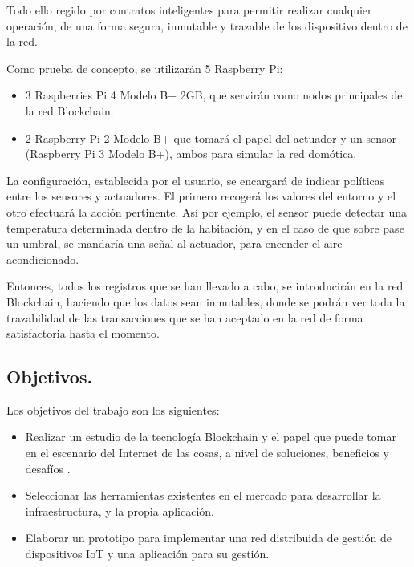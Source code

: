 \vspace{5mm}

\noindent Todo ello regido por contratos inteligentes para permitir realizar cualquier operación, de una forma segura, 
inmutable y trazable de los dispositivo dentro de la red.

\vspace{20mm}

\noindent Como prueba de concepto, se utilizarán 5 Raspberry Pi: 

\begin{itemize}
	\item 3 Raspberries Pi 4 Modelo B+ 2GB, que servirán como nodos principales de la red Blockchain.
	\item 2 Raspberry Pi 2 Modelo B+ que tomará el papel del actuador y un sensor (Raspberry Pi 3 Modelo B+), ambos 
	para simular la red domótica.
\end{itemize}

\noindent La configuración, establecida por el usuario, se encargará de indicar políticas entre los sensores 
y actuadores. El primero recogerá los valores del entorno y el otro efectuará la acción pertinente. Así por ejemplo, 
el sensor puede detectar una temperatura determinada dentro de la habitación, y en el caso de que sobre pase un 
umbral, se mandaría una señal al actuador, para encender el aire acondicionado. \cite{huh2017managing}

\vspace{5mm}

\noindent Entonces, todos los registros que se han llevado a cabo, se introducirán en la red Blockchain, haciendo que 
los datos sean inmutables, donde se podrán ver toda la trazabilidad de las transacciones que se han aceptado en la red 
de forma satisfactoria hasta el momento.

\subsection{Objetivos.}

Los objetivos del trabajo son los siguientes:

\begin{itemize}
    \item Realizar un estudio de la tecnología Blockchain y el papel que puede tomar en el escenario del Internet de 
    las cosas, a nivel de soluciones, beneficios y desafíos \cite{khan2018iot, reyna2018blockchain}. 
    \item Seleccionar las herramientas existentes en el mercado para desarrollar la infraestructura, y la propia 
    aplicación.
    \item Elaborar un prototipo para implementar una red distribuida de gestión de dispositivos IoT y una aplicación
    para su gestión.
\end{itemize}

